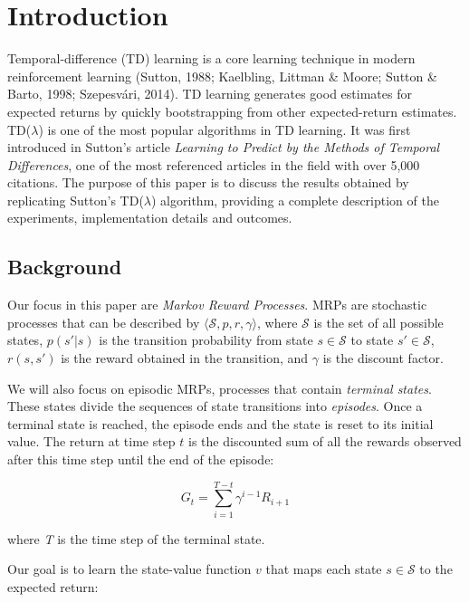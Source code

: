 \documentclass{article}
\begin{document}
    \section{Introduction}
    \label{sec:introduction}
    Temporal-difference (TD) learning is a core learning technique in modern reinforcement learning  (Sutton, 1988; Kaelbling, Littman \& Moore; Sutton \& Barto, 1998; Szepesvári, 2014).
    TD learning generates good estimates for expected returns by quickly bootstrapping from other expected-return estimates. TD($\lambda$) is one of the most popular algorithms in TD learning.
    It was first introduced in Sutton's article \emph{Learning to Predict by the Methods of Temporal Differences}, one of the most referenced articles in the field with over 5,000 citations.
    The purpose of this paper is to discuss the results obtained by replicating Sutton's TD($\lambda$) algorithm, providing a complete description of the experiments, implementation details and outcomes.

    \subsection{Background}
    \label{subsec:background}
    Our focus in this paper are \emph{Markov Reward Processes}.
    MRPs are stochastic processes that can be described by \(\langle\mathcal{S}, p, r, \gamma\rangle\), where \(\mathcal{S}\) is the set of all possible states, \(p(s'|s)\) is the transition probability from state \(s \in \mathcal{S}\) to state \(s' \in \mathcal{S}\), \(r(s, s')\) is the reward obtained in the transition, and \(\gamma\) is the discount factor.

    We will also focus on episodic MRPs, processes that contain \emph{terminal states}.
    These states divide the sequences of state transitions into \emph{episodes}.
    Once a terminal state is reached, the episode ends and the state is reset to its initial value.
    The return at time step \(t\) is the discounted sum of all the rewards observed after this time step until the end of the episode:

    \begin{equation}
        G_{t} = \sum_{i=1}^{T-t} \gamma^{i-1} R_{i+1}\label{eqn:1}
    \end{equation}

    where \emph{T} is the time step of the terminal state.

    Our goal is to learn the state-value function $v$ that maps each state $s \in \mathcal{S}$ to the expected return:
\end{document}
